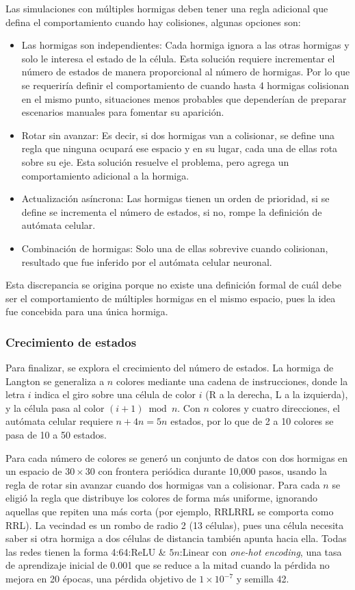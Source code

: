 Las simulaciones con múltiples hormigas deben tener una regla adicional que defina el comportamiento cuando hay colisiones, algunas opciones son:
\begin{itemize}
	\item Las hormigas son independientes: Cada hormiga ignora a las otras hormigas y solo le interesa el estado de la célula. Esta solución requiere incrementar el número de estados de manera proporcional al número de hormigas. Por lo que se requeriría definir el comportamiento de cuando hasta 4 hormigas colisionan en el mismo punto, situaciones menos probables que dependerían de preparar escenarios manuales para fomentar su aparición.
	\item Rotar sin avanzar: Es decir, si dos hormigas van a colisionar, se define una regla que ninguna ocupará ese espacio y en su lugar, cada una de ellas rota sobre su eje. Esta solución resuelve el problema, pero agrega un comportamiento adicional a la hormiga. 
	\item Actualización asíncrona: Las hormigas tienen un orden de prioridad, si se define se incrementa el número de estados, si no, rompe la definición de autómata celular.
	\item Combinación de hormigas: Solo una de ellas sobrevive cuando colisionan, resultado que fue inferido por el autómata celular neuronal.
\end{itemize}

Esta discrepancia se origina porque no existe una definición formal de cuál debe ser el comportamiento de múltiples hormigas en el mismo espacio, pues la idea fue concebida para una única hormiga.

\subsubsection{Crecimiento de estados}

Para finalizar, se explora el crecimiento del número de estados. La hormiga de Langton se generaliza a $n$ colores mediante una cadena de instrucciones, donde la letra $i$ indica el giro sobre una célula de color $i$ (R a la derecha, L a la izquierda), y la célula pasa al color $(i+1) \bmod n$. Con $n$ colores y cuatro direcciones, el autómata celular requiere $n + 4n = 5n$ estados, por lo que de 2 a 10 colores se pasa de 10 a 50 estados.

Para cada número de colores se generó un conjunto de datos con dos hormigas en un espacio de $30 \times 30$ con frontera periódica durante 10,000 pasos, usando la regla de rotar sin avanzar cuando dos hormigas van a colisionar. Para cada $n$ se eligió la regla que distribuye los colores de forma más uniforme, ignorando aquellas que repiten una más corta (por ejemplo, RRLRRL se comporta como RRL). La vecindad es un rombo de radio 2 (13 células), pues una célula necesita saber si otra hormiga a dos células de distancia también apunta hacia ella. Todas las redes tienen la forma 4:64:ReLU \& $5n$:Linear con \textit{one-hot encoding}, una tasa de aprendizaje inicial de 0.001 que se reduce a la mitad cuando la pérdida no mejora en 20 épocas, una pérdida objetivo de $1 \times 10^{-7}$ y semilla 42.

